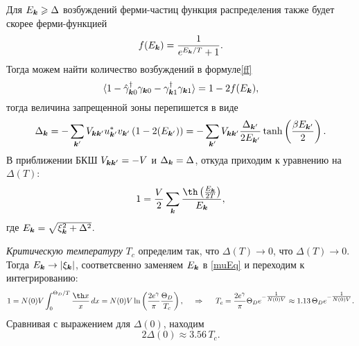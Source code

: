
Для $E_{{\boldsymbol{k}}} \geqslant \Delta$ возбуждений ферми-частиц функция распределения также будет скорее ферми-функцией
\begin{equation*}
	f(E_{{\boldsymbol{k}}}) = \frac{1}{e^{E_{{\boldsymbol{k}}}/T}+1}.
\end{equation*}
Тогда можем найти количество возбуждений в формуле\eqref{ff} 
\begin{equation*}
	\langle 1 - \hat{\gamma}_{{\boldsymbol{k}}0}^{\dag} \gamma_{{\boldsymbol{k}}0} - \gamma_{{\boldsymbol{k}}1}^{\dag} \gamma_{{\boldsymbol{k}}1}\rangle = 1 - 2 f(E_{{\boldsymbol{k}}}),
\end{equation*}
тогда величина запрещенной зоны перепишется в виде
\begin{equation*}
	\Delta_{{\boldsymbol{k}}} = - \sum_{{\boldsymbol{k}}'} V_{{\boldsymbol{k}} {\boldsymbol{k}}'} u_{{\boldsymbol{k}}'}^* v_{{\boldsymbol{k}}'} \left(1 - 2(E_{{\boldsymbol{k}}'})\right) = - \sum_{{\boldsymbol{k}}'} V_{{\boldsymbol{k}} {\boldsymbol{k}}'} \frac{\Delta_{{\boldsymbol{k}}'}}{2 E_{{\boldsymbol{k}}'}} \tanh\left(
		\frac{\beta E_{{\boldsymbol{k}}'}}{2}
	\right).
\end{equation*}
В приближении БКШ $V_{{\boldsymbol{k}} {\boldsymbol{k}}'} = -V$ и $\Delta_{{\boldsymbol{k}}} = \Delta$, откуда приходим к уравнению на $\Delta(T)$:
\begin{equation}
	1 = \frac{V}{2} \sum_{\vc{k}} \frac{\th\left(\frac{E_{\vc{k}}}{2 T}\right)}{E_{\vc{k}}},
	\label{muEq}
\end{equation}
где $E_{{\boldsymbol{k}}} = \sqrt{\xi_{{\boldsymbol{k}}}^2 + \Delta^2}$.



\textit{Критическую температуру} $T_c$ определим так, что $\Delta(T) \to 0$, что $\Delta(T) \to 0$. Тогда
$E_{{\boldsymbol{k}}} \to |\xi_{{\boldsymbol{k}}}|$, соответсвенно заменяем $E_{{\boldsymbol{k}}}$ в \eqref{muEq} и переходим к интегрированию:
\begin{equation*}
	1 = N(0) V \int_{0}^{\Theta_D/T} \frac{\th x}{x} \d x = N(0) V \ln\left(
		\frac{2 e^{\gamma}}{\pi} \frac{\Theta_D}{T_c}
	\right),
	\hspace{0.5cm} \Rightarrow \hspace{0.5cm}
	T_c = \frac{2 e^{\gamma}}{\pi} \Theta_D e^{-\tfrac{1}{N(0) V}} \approx 1.13\, \Theta_D e^{-\tfrac{1}{N(0) V}}.
\end{equation*}
Сравнивая с выражением для $\Delta(0)$, находим
\begin{equation*}
	2 \Delta(0) \approx 3.56\, T_c.
\end{equation*}





